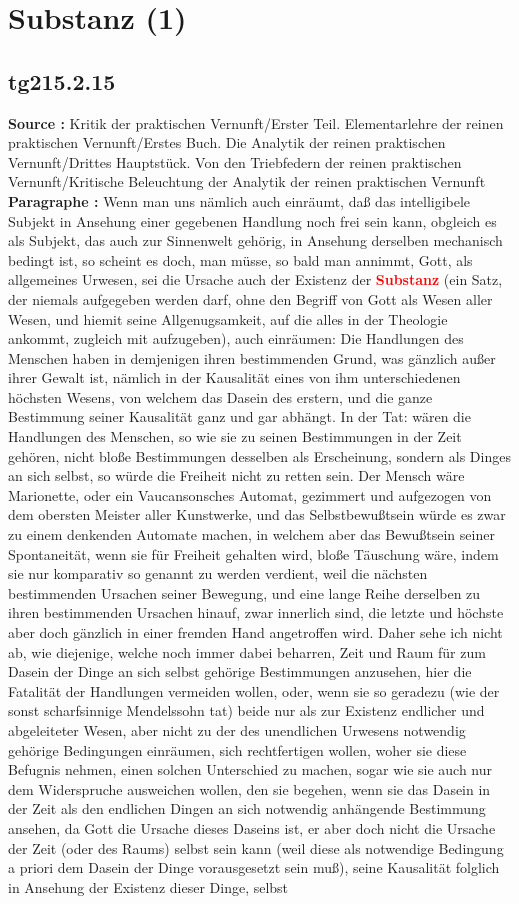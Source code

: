 \documentclass[a4paper,12pt,twoside]{book}
\newcommand{\match}[1]{\textcolor{red}{\textbf{#1}}}
\newcommand{\unnumberedsection}[1]{
	\section*{#1}
	\addcontentsline{toc}{section}{#1}
	\markright{#1}
}
\begin{document}
	\unnumberedsection{Substanz (1)} 
	\subsection*{tg215.2.15} 
	\textbf{Source : }Kritik der praktischen Vernunft/Erster Teil. Elementarlehre der reinen praktischen Vernunft/Erstes Buch. Die Analytik der reinen praktischen Vernunft/Drittes Hauptstück. Von den Triebfedern der reinen praktischen Vernunft/Kritische Beleuchtung der Analytik der reinen praktischen Vernunft\\  
	
	\textbf{Paragraphe : }Wenn man uns nämlich auch einräumt, daß das intelligibele Subjekt in Ansehung einer gegebenen Handlung noch frei sein kann, obgleich es als Subjekt, das auch zur Sinnenwelt gehörig, in Ansehung derselben mechanisch bedingt ist, so scheint es doch, man müsse, so bald man annimmt, Gott, als allgemeines Urwesen, sei die Ursache auch der Existenz der \match{Substanz} (ein Satz, der niemals aufgegeben  werden darf, ohne den Begriff von Gott als Wesen aller Wesen, und hiemit seine Allgenugsamkeit, auf die alles in der Theologie ankommt, zugleich mit aufzugeben), auch einräumen: Die Handlungen des Menschen haben in demjenigen ihren bestimmenden Grund, was gänzlich außer ihrer Gewalt ist, nämlich in der Kausalität eines von ihm unterschiedenen höchsten Wesens, von welchem das Dasein des erstern, und die ganze Bestimmung seiner Kausalität ganz und gar abhängt. In der Tat: wären die Handlungen des Menschen, so wie sie zu seinen Bestimmungen in der Zeit gehören, nicht bloße Bestimmungen desselben als Erscheinung, sondern als Dinges an sich selbst, so würde die Freiheit nicht zu retten sein. Der Mensch wäre Marionette, oder ein Vaucansonsches Automat, gezimmert und aufgezogen von dem obersten Meister aller Kunstwerke, und das Selbstbewußtsein würde es zwar zu einem denkenden Automate machen, in welchem aber das Bewußtsein seiner Spontaneität, wenn sie für Freiheit gehalten wird, bloße Täuschung wäre, indem sie nur komparativ so genannt zu werden verdient, weil die nächsten bestimmenden Ursachen seiner Bewegung, und eine lange Reihe derselben zu ihren bestimmenden Ursachen hinauf, zwar innerlich sind, die letzte und höchste aber doch gänzlich in einer fremden Hand angetroffen wird. Daher sehe ich nicht ab, wie diejenige, welche noch immer dabei beharren, Zeit und Raum für zum Dasein der Dinge an sich selbst gehörige Bestimmungen anzusehen, hier die Fatalität der Handlungen vermeiden wollen, oder, wenn sie so geradezu (wie der sonst scharfsinnige Mendelssohn tat) beide nur als zur Existenz endlicher und abgeleiteter Wesen, aber nicht zu der des unendlichen Urwesens notwendig gehörige Bedingungen einräumen, sich rechtfertigen wollen, woher sie diese Befugnis nehmen, einen solchen Unterschied zu machen, sogar wie sie auch nur dem Widerspruche ausweichen wollen, den sie begehen, wenn sie das Dasein in der Zeit als den endlichen Dingen an sich notwendig anhängende Bestimmung ansehen, da Gott die Ursache dieses Daseins ist, er aber doch nicht die Ursache der Zeit (oder des Raums) selbst sein kann (weil diese als  notwendige Bedingung a priori dem Dasein der Dinge vorausgesetzt sein muß), seine Kausalität folglich in Ansehung der Existenz dieser Dinge, selbst 
\end{document}
